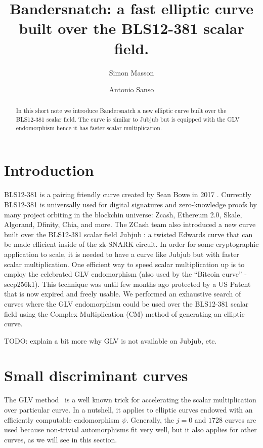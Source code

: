 \documentclass{amsart}
\newcommand{\SM}[1]{\color{blue}#1\color{black}}
\begin{document}
\title[Bandersnatch]{Bandersnatch: a fast elliptic curve built over the BLS12-381 scalar field.}
\author{Simon Masson}
\address{Heliax}
\author{Antonio Sanso}
\address{Ethereum Foundation and Ruhr Universit{\"a}t Bochum}


\maketitle
\medskip
\begin{abstract}
 In this short note we  introduce Bandersnatch a new elliptic curve built over the BLS12-381 \cite{bls12381} scalar field. The curve is similar to Jubjub \cite{jubjub} but is equipped with the GLV endomorphism \cite{C:GalLamVan01} hence it has faster scalar multiplication.
 \end{abstract}

\section{Introduction}
BLS12-381 is a pairing friendly curve created by Sean Bowe in 2017
\cite{bls12381}. Currently BLS12-381 is universally used for digital
signatures and zero-knowledge proofs by many project orbiting in the
blockchin universe: Zcash, Ethereum 2.0, Skale, Algorand, Dfinity,
Chia, and more.
The ZCash team also introduced a new curve built over the BLS12-381
scalar field Jubjub  \cite{jubjub}: a twisted Edwards curve that can
be made efficient inside of the zk-SNARK circuit.
In order for some cryptographic application to scale, it is needed to
have a curve like Jubjub but with faster scalar multiplication. One
efficient way to speed scalar multiplication up is to employ the
celebrated GLV endomorphism \cite{C:GalLamVan01} (also used
by the “Bitcoin curve” - secp256k1).
This technique was until few months ago protected by a US Patent that
is now expired and freely usable.
We performed an exhaustive search of curves where the GLV endomorphism
could be used over the BLS12-381 scalar field using the Complex
Multiplication (CM) method of generating an elliptic curve.

\SM{TODO: explain a bit more why GLV is not available on Jubjub, etc.}

\section{Small discriminant curves}

The GLV method~\cite{C:GalLamVan01} is a well known trick for accelerating the
scalar multiplication over particular curve. In a nutshell, it applies
to elliptic curves endowed with an efficiently computable endomorphism
$\psi$.
Generally, the $j=0$ and $1728$ curves are used because non-trivial
automorphisms fit very well, but it also applies for other curves, as
we will see in this section.
\end{document}
